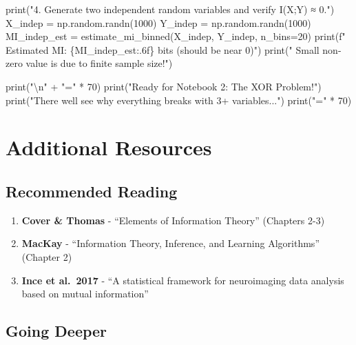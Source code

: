 \documentclass[
  11pt,
  letterpaper,
  oneside,
  openany]{book}
\newenvironment{Shaded}{\begin{snugshade}}{\end{snugshade}}
\newcommand{\BuiltInTok}[1]{\textcolor[rgb]{0.00,0.23,0.31}{#1}}
\newcommand{\CharTok}[1]{\textcolor[rgb]{0.13,0.47,0.30}{#1}}
\newcommand{\DecValTok}[1]{\textcolor[rgb]{0.68,0.00,0.00}{#1}}
\newcommand{\NormalTok}[1]{\textcolor[rgb]{0.00,0.23,0.31}{#1}}
\newcommand{\OperatorTok}[1]{\textcolor[rgb]{0.37,0.37,0.37}{#1}}
\newcommand{\SpecialCharTok}[1]{\textcolor[rgb]{0.37,0.37,0.37}{#1}}
\newcommand{\SpecialStringTok}[1]{\textcolor[rgb]{0.13,0.47,0.30}{#1}}
\newcommand{\StringTok}[1]{\textcolor[rgb]{0.13,0.47,0.30}{#1}}
\providecommand{\tightlist}{%
  \setlength{\itemsep}{0pt}\setlength{\parskip}{0pt}}
\begin{document}
\begin{Shaded}
\begin{Highlighting}[]
\BuiltInTok{print}\NormalTok{(}\StringTok{"4. Generate two independent random variables and verify I(X;Y) ≈ 0."}\NormalTok{)}
\NormalTok{X\_indep }\OperatorTok{=}\NormalTok{ np.random.randn(}\DecValTok{1000}\NormalTok{)}
\NormalTok{Y\_indep }\OperatorTok{=}\NormalTok{ np.random.randn(}\DecValTok{1000}\NormalTok{)}
\NormalTok{MI\_indep\_est }\OperatorTok{=}\NormalTok{ estimate\_mi\_binned(X\_indep, Y\_indep, n\_bins}\OperatorTok{=}\DecValTok{20}\NormalTok{)}
\BuiltInTok{print}\NormalTok{(}\SpecialStringTok{f"   Estimated MI: }\SpecialCharTok{\{}\NormalTok{MI\_indep\_est}\SpecialCharTok{:.6f\}}\SpecialStringTok{ bits (should be near 0)"}\NormalTok{)}
\BuiltInTok{print}\NormalTok{(}\StringTok{"   Small non{-}zero value is due to finite sample size!"}\NormalTok{)}

\BuiltInTok{print}\NormalTok{(}\StringTok{"}\CharTok{\textbackslash{}n}\StringTok{"} \OperatorTok{+} \StringTok{"="} \OperatorTok{*} \DecValTok{70}\NormalTok{)}
\BuiltInTok{print}\NormalTok{(}\StringTok{"Ready for Notebook 2: The XOR Problem!"}\NormalTok{)}
\BuiltInTok{print}\NormalTok{(}\StringTok{"There we\textquotesingle{}ll see why everything breaks with 3+ variables..."}\NormalTok{)}
\BuiltInTok{print}\NormalTok{(}\StringTok{"="} \OperatorTok{*} \DecValTok{70}\NormalTok{)}
\end{Highlighting}
\end{Shaded}

\section{Additional Resources}\label{additional-resources}

\subsection{Recommended Reading}\label{recommended-reading}

\begin{enumerate}
\def\labelenumi{\arabic{enumi}.}
\tightlist
\item
  \textbf{Cover \& Thomas} - ``Elements of Information Theory''
  (Chapters 2-3)
\item
  \textbf{MacKay} - ``Information Theory, Inference, and Learning
  Algorithms'' (Chapter 2)
\item
  \textbf{Ince et al.~2017} - ``A statistical framework for neuroimaging
  data analysis based on mutual information''
\end{enumerate}

\subsection{Going Deeper}\label{going-deeper}
\end{document}
